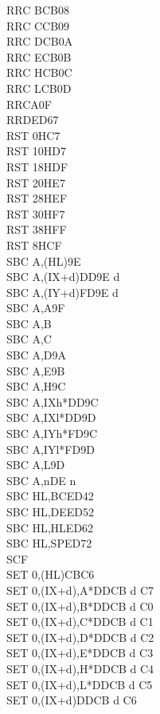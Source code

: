 \documentclass[oneside,a4paper]{book}
\begin{document}
\begin{multicols}{3}
{\begin{tabbing}
RRC B\>CB08\\
RRC C\>CB09\\
RRC D\>CB0A\\
RRC E\>CB0B\\
RRC H\>CB0C\\
RRC L\>CB0D\\
RRCA\>0F\\
RRD\>ED67\\
RST 0H\>C7\\
RST 10H\>D7\\
RST 18H\>DF\\
RST 20H\>E7\\
RST 28H\>EF\\
RST 30H\>F7\\
RST 38H\>FF\\
RST 8H\>CF\\
SBC A,(HL)\>9E\\
SBC A,(IX+d)\>DD9E d\\
SBC A,(IY+d)\>FD9E d\\
SBC A,A\>9F\\
SBC A,B\\
SBC A,C\\
SBC A,D\>9A\\
SBC A,E\>9B\\
SBC A,H\>9C\\
SBC A,IXh*\>DD9C\\
SBC A,IXl*\>DD9D\\
SBC A,IYh*\>FD9C\\
SBC A,IYl*\>FD9D\\
SBC A,L\>9D\\
SBC A,n\>DE n\\
SBC HL,BC\>ED42\\
SBC HL,DE\>ED52\\
SBC HL,HL\>ED62\\
SBC HL,SP\>ED72\\
SCF\\
SET 0,(HL)\>CBC6\\
SET 0,(IX+d),A*\>DDCB d C7\\
SET 0,(IX+d),B*\>DDCB d C0\\
SET 0,(IX+d),C*\>DDCB d C1\\
SET 0,(IX+d),D*\>DDCB d C2\\
SET 0,(IX+d),E*\>DDCB d C3\\
SET 0,(IX+d),H*\>DDCB d C4\\
SET 0,(IX+d),L*\>DDCB d C5\\
SET 0,(IX+d)\>DDCB d C6\\

\end{tabbing}}
\end{multicols}
\end{document}
